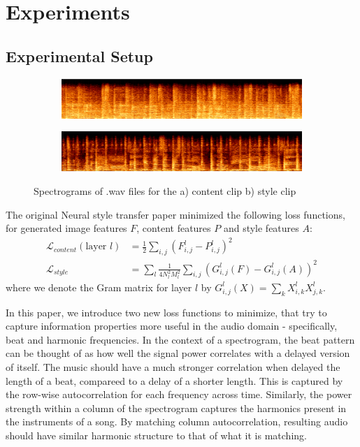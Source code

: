 \documentclass{article}
\begin{document}
\section{Experiments}

\subsection{Experimental Setup}

\begin{figure}[h]
\begin{subfigure}{\textwidth}
  \centering
  \includegraphics[width = \textwidth]{content_spec}
  \caption{}
\end{subfigure}
\begin{subfigure}{\textwidth}
  \centering
  \includegraphics[width = \textwidth]{style_spec}
  \caption{}
\end{subfigure}
\caption{Spectrograms of .wav files for the a) content clip b) style clip}
\end{figure}

The original Neural style transfer paper minimized the following loss functions, for generated image features $F$, content features $P$ and style features $A$:
\begin{align*}
\mathcal{L}_{content}(\text{layer } l) &= \frac{1}{2} \sum_{i, j} (F_{i, j}^{l} - P_{i, j}^{l})^2 \\
\mathcal{L}_{style} &= \sum_l \frac{1}{4N_l^2M_l^2}\sum_{i,j}(G_{i,j}^l(F) - G_{i,j}^l(A))^2
\end{align*}
where we denote the Gram matrix for layer $l$ by $G_{i,j}^l(X) = \sum_k X_{i,k}^l X_{j,k}^l$. 

In this paper, we introduce two new loss functions to minimize, that try to capture information properties more useful in the audio domain - specifically, beat and harmonic frequencies. In the context of a spectrogram, the beat pattern can be thought of as how well the signal power correlates with a delayed version of itself.  The music should have a much stronger correlation when delayed the length of a beat, compareed to a delay of a shorter length. This is captured by the row-wise autocorrelation for each frequency across time. Similarly, the power strength within a column of the spectrogram captures the harmonics present in the instruments of a song. By matching column autocorrelation, resulting audio should have similar harmonic structure to that of what it is matching.
\end{document}

